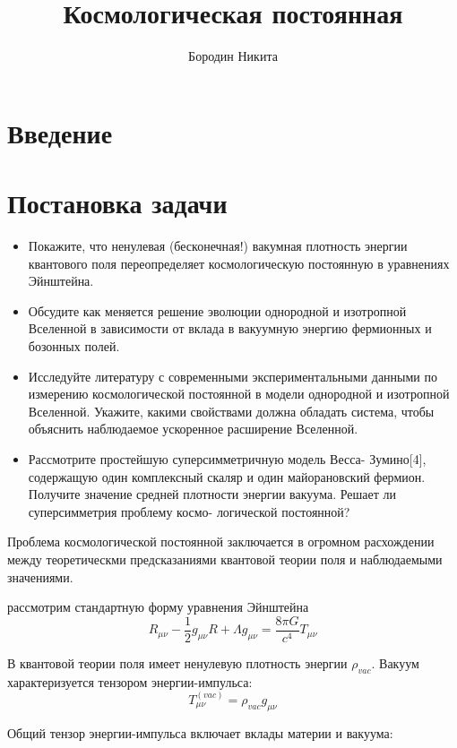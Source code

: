 \documentclass[12pt]{article}
\begin{document}
	\title{Космологическая постоянная}
	
	\author{Бородин Никита}
	
	
	
	\maketitle
	\newpage
	\section{Введение}
	
	\section*{\textbf{Постановка задачи}}
	\begin{itemize}
		\item 	Покажите, что ненулевая (бесконечная!) вакумная плотность энергии квантового поля переопределяет космологическую
		постоянную в уравнениях Эйнштейна.
		\item  Обсудите как меняется решение эволюции однородной
		и изотропной Вселенной в зависимости от вклада в вакуумную
		энергию фермионных и бозонных полей.
		\item  Исследуйте литературу с современными экспериментальными данными по измерению космологической постоянной в
		модели однородной и изотропной Вселенной. Укажите, какими
		свойствами должна обладать система, чтобы объяснить наблюдаемое ускоренное расширение Вселенной.
		\item Рассмотрите простейшую суперсимметричную модель Весса-
		Зумино[4], содержащую один комплексный скаляр и один майорановский фермион. Получите значение средней плотности
		энергии вакуума. Решает ли суперсимметрия проблему космо-
		логической постоянной?
	\end{itemize}
	
	Проблема космологической постоянной заключается в огромном расхождении между теоретическми предсказаниями квантовой теории поля и наблюдаемыми значениями.
	
	рассмотрим стандартную форму уравнения Эйнштейна
	\[
	 R_{\mu \nu} - \frac{1}{2} g_{\mu \nu} R + \Lambda g_{\mu \nu} = \frac{8 \pi G}{c^4} T_{\mu \nu}
	\]
	
	В квантовой теории поля имеет ненулевую плотность энергии $\rho_{vac}$. Вакуум характеризуется тензором энергии-импульса:
	\[
	T_{\mu \nu}^{(vac)} = \rho_{vac} g_{\mu \nu}
	\]
	
	Общий тензор энергии-импульса включает вклады материи и вакуума:
	
\end{document}
